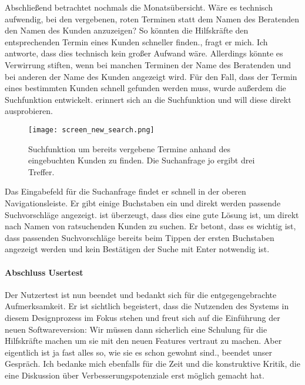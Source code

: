 Abschließend betrachtet \ipName nochmals die Monatsübersicht. \glqq{} Wäre es
technisch aufwendig, bei den vergebenen, roten Terminen statt dem Namen des
Beratenden den Namen des Kunden anzuzeigen? So könnten die Hilfskräfte den
entsprechenden Termin eines Kunden schneller finden.\grqq{}, fragt er mich. Ich
antworte, dass dies technisch kein großer Aufwand wäre. Allerdings könnte es
Verwirrung stiften, wenn bei manchen Terminen der Name des Beratenden und bei
anderen der Name des Kunden angezeigt wird. Für den Fall, dass der Termin eines
bestimmten Kunden schnell gefunden werden muss, wurde außerdem die Suchfunktion
entwickelt. \ipName erinnert sich an die Suchfunktion und will diese direkt
ausprobieren.

\begin{figure}[H]
    \caption{Suchfunktion um bereits vergebene Termine anhand des eingebuchten Kunden zu finden. Die Suchanfrage \glqq{}jo\grqq{} ergibt drei Treffer.}
    \centering
    \texttt{[image: screen\_new\_search.png]}
\end{figure}

Das Eingabefeld für die Suchanfrage findet er schnell in der oberen
Navigationsleiste. Er gibt einige Buchstaben ein und direkt werden passende
Suchvorschläge angezeigt. \ipName ist überzeugt, dass dies eine gute Lösung
ist, um direkt nach Namen von ratsuchenden Kunden zu suchen. Er betont, dass es
wichtig ist, dass passenden Suchvorschläge bereits beim Tippen der ersten
Buchstaben angezeigt werden und kein Bestätigen der Suche mit Enter notwendig
ist.

\paragraph{Abschluss Usertest}
Der Nutzertest ist nun beendet und \ipName bedankt sich für die
entgegengebrachte Aufmerksamkeit. Er ist sichtlich begeistert, dass die
Nutzenden des Systems in diesem Designprozess im Fokus stehen und freut sich
auf die Einführung der neuen Softwareversion: \glqq{} Wir müssen dann
sicherlich eine Schulung für die Hilfskräfte machen um sie mit den neuen
Features vertraut zu machen. Aber eigentlich ist ja fast alles so, wie sie es
schon gewohnt sind.\grqq{}, beendet \ipName unser Gespräch. Ich bedanke mich
ebenfalls für die Zeit und die konstruktive Kritik, die eine Diskussion über
Verbesserungspotenziale erst möglich gemacht hat.